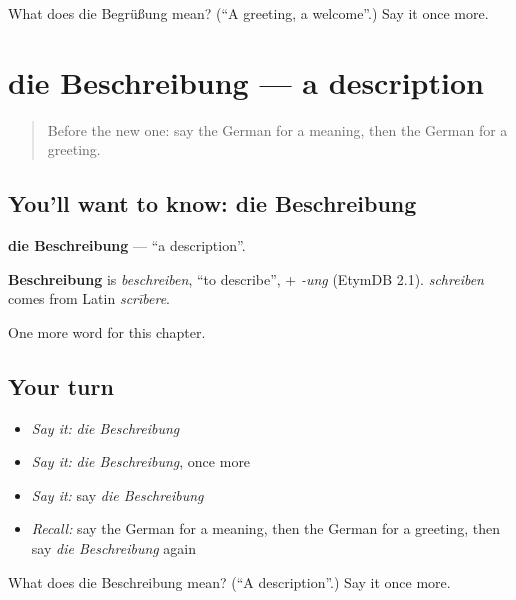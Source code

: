 \begin{tcolorbox}[breakable,colback=teal!4,colframe=teal!35!black,title={Before you move on}]
What does die Begrüßung mean? (\textquotedblleft{}A greeting, a welcome\textquotedblright{}.) Say it once more.
\end{tcolorbox}
\section[die Beschreibung]{die Beschreibung — a description}

\label{lesson:GE-C226-beschreibung}



\begin{quote}
Before the new one: say the German for a meaning, then the German for a greeting.
\end{quote}

\subsection*{You'll want to know: die Beschreibung}
\textbf{die Beschreibung} — \textquotedblleft{}a description\textquotedblright{}.

\begin{cousinweb}
\textbf{Beschreibung} is \emph{beschreiben}, \textquotedblleft{}to describe\textquotedblright{}, + \emph{-ung} (EtymDB 2.1). \emph{schreiben} comes from Latin \emph{scrībere}.
\end{cousinweb}

\begin{grammarlens}[title={What you've built}]
One more word for this chapter.
\end{grammarlens}

\subsection*{Your turn}
\begin{itemize}
\raggedright
  \item \emph{Say it:} \emph{die Beschreibung}
  \item \emph{Say it:} \emph{die Beschreibung}, once more
  \item \emph{Say it:} say \emph{die Beschreibung}
  \item \emph{Recall:} say the German for a meaning, then the German for a greeting, then say \emph{die Beschreibung} again
\end{itemize}

\begin{tcolorbox}[breakable,colback=teal!4,colframe=teal!35!black,title={Before you move on}]
What does die Beschreibung mean? (\textquotedblleft{}A description\textquotedblright{}.) Say it once more.
\end{tcolorbox}
